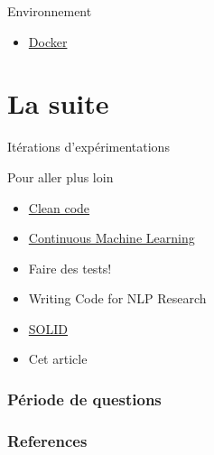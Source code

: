 \documentclass[aspectratio=169,10pt,xcolor=x11names,english,french]{beamer}
\begin{document}
	\begin{frame}{Environnement}
		\begin{itemize}
			\item \href{https://www.docker.com/}{Docker}
		\end{itemize}
	\end{frame}
		
	\section{La suite}
	\begin{frame}
		\centering
		\fontsize{35}{35}\selectfont\textcolor[cmyk]{0.67, 0.66, 0, 0.71}\faRefresh\vfil
		\normalsize Itérations d'expérimentations
	\end{frame}
	
	\begin{frame}{Pour aller plus loin}
		\begin{itemize}
			\item \href{https://www.oreilly.com/library/view/clean-code-a/9780136083238/}{Clean code}
			\item \href{https://github.com/iterative/cml}{Continuous Machine Learning}
			\item Faire des tests!
			\item Writing Code for NLP Research \cite{gardner-etal-2018-writing}
			\item \href{https://www.youtube.com/watch?v=t86v3N4OshQ&list=LLFp5G_2HoipBrGaw9iAcPPw&index=693}{SOLID}
			\item Cet article \cite{pineau2020improving}
		\end{itemize}
	\end{frame}
	
	\begin{frame}
		\frametitle{Période de questions}
		
		\centering
		\fontsize{100}{100}\selectfont\textcolor[cmyk]{0.67, 0.66, 0, 0.71}
		\faQuestion
		
	\end{frame}

	
	
	\begin{frame}[t, allowframebreaks]
		\frametitle{References}
		
		
	\end{frame}
	
	
	
\end{document}

